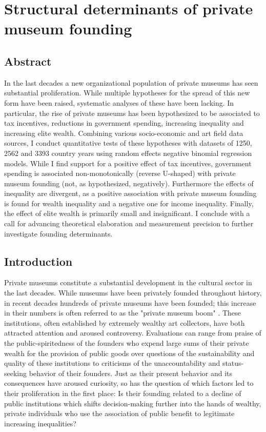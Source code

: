 \documentclass[11pt]{article}
\author{Johannes Aengenheyster}
\date{\today}
\title{}
\begin{document}
\section*{Structural determinants of private museum founding}


\subsection*{Abstract}

In the last decades a new organizational population of private museums has seen substantial proliferation.
While multiple hypotheses for the spread of this new form have been raised, systematic analyses of these have been lacking.
In particular, the rise of private museums has been hypothesized to be associated to tax incentives, reductions in government spending, increasing inequality and increasing elite wealth. 
Combining various socio-economic and art field data sources, I conduct quantitative tests of these hypotheses with datasets of 1250, 2562 and 3393 country years using random effects negative binomial regression models.
While I find support for a positive effect of tax incentives, government spending is associated non-monotonically (reverse U-shaped) with private museum founding (not, as hypothesized, negatively). 
Furthermore the effects of inequality are divergent, as a positive association with private museum founding is found for wealth inequality and a negative one for income inequality.
Finally, the effect of elite wealth is primarily small and insignificant. 
I conclude with a call for advancing theoretical elaboration and measurement precision to further investigate founding determinants. 





\subsection*{Introduction}

Private museums constitute a substantial development in the cultural sector in the last decades.
While museums have been privately founded throughout history, in recent decades hundreds of private museums have been founded; this increase in their numbers is often referred to as the "private museum boom" \parencite{Walker_2019_collector}. 
These institutions, often established by extremely wealthy art collectors, have both attracted attention and aroused controversy.
Evaluations can range from praise of the public-spiritedness of the founders who expend large sums of their private wealth for the provision of public goods over questions of the sustainability and quality of these institutions to criticisms of the unaccountability and status-seeking behavior of their founders. 
Just as their present behavior and its consequences have aroused curiosity, so has the question of which factors led to their proliferation in the first place:
Is their founding related to a decline of public institutions which shifts decision-making further into the hands of wealthy, private individuals who use the association of public benefit to legitimate increasing inequalities?
\end{document}
